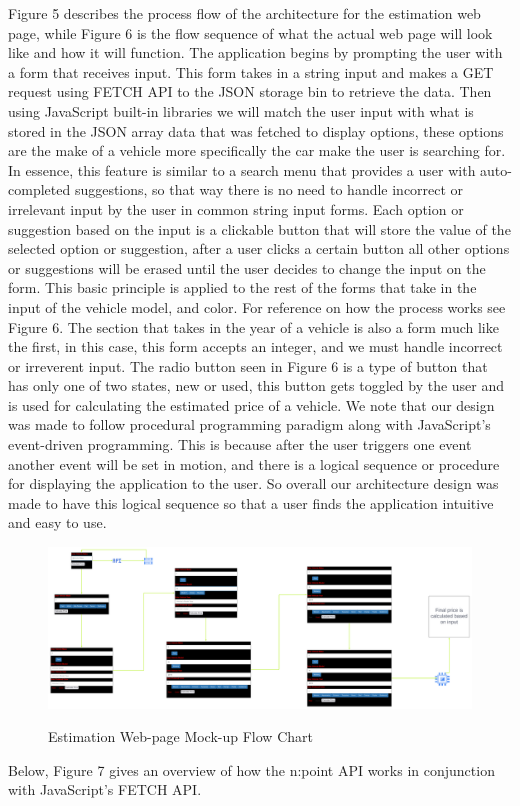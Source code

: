 \documentclass[12pt]{article}
\begin{document}
\noindent Figure 5 describes the process flow of the architecture for the estimation web page, while Figure 6 is the flow sequence of what the actual web page will look like and how it will function. The application begins by prompting the user with a form that receives input. This form takes in a string input and makes a GET request using FETCH API to the JSON storage bin to retrieve the data. Then using JavaScript built-in libraries we will match the user input with what is stored in the JSON array data that was fetched to display options, these options are the make of a vehicle more specifically the car make the user is searching for. In essence, this feature is similar to a search menu that provides a user with auto-completed suggestions, so that way there is no need to handle incorrect or irrelevant input by the user in common string input forms. Each option or suggestion based on the input is a clickable button that will store the value of the selected option or suggestion, after a user clicks a certain button all other options or suggestions will be erased until the user decides to change the input on the form. This basic principle is applied to the rest of the forms that take in the input of the vehicle model, and color. For reference on how the process works see Figure 6. 
The section that takes in the year of a vehicle is also a form much like the first, in this case, this form accepts an integer, and we must handle incorrect or irreverent input. The radio button seen in Figure 6 is a type of button that has only one of two states, new or used, this button gets toggled by the user and is used for calculating the estimated price of a vehicle. We note that our design was made to follow procedural programming paradigm along with JavaScript's event-driven programming. This is because after the user triggers one event another event will be set in motion, and there is a logical sequence or procedure for displaying the application to the user. So overall our architecture design was made to have this logical sequence so that a user finds the application intuitive and easy to use.
\begin{figure}[H]
\caption{Estimation Web-page Mock-up Flow Chart}
\centering
\includegraphics[scale=.078]{figures/Second Mockup.png}\\
\end{figure}
\noindent Below, Figure 7 gives an overview of how the n:point API works in conjunction with JavaScript's FETCH API.   
\end{document}
